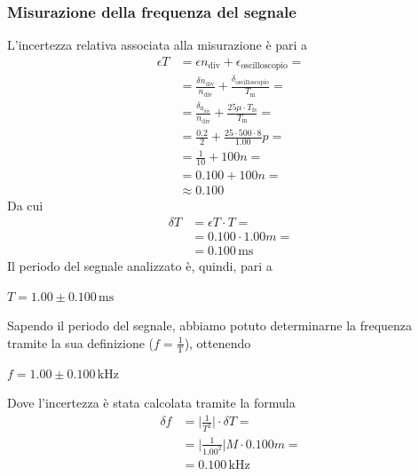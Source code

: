 \documentclass{article}
\begin{document}
			\subsubsection{Misurazione della frequenza del segnale}
				L'incertezza relativa associata alla misurazione è pari a 
				\begin{equation*}
					\begin{split}
						\epsilon T &= \epsilon n_{\mathrm{div}} + \epsilon_{\mathrm{oscilloscopio}} = \\
								   &= \frac{\delta n_{\mathrm{div}}}{n_{\mathrm{div}}} + \frac{\delta_{\mathrm{oscilloscopio}}}{T_{\mathrm{m}}} = \\
								   &= \frac{\delta_{\mathrm{n_{\mathrm{div}}}}}{n_{\mathrm{div}}} + \frac{25\mu \cdot T_{\mathrm{fs}}}{T_{\mathrm{m}}} = \\
								   &= \frac{0.2}{2} + \frac{25 \cdot 500 \cdot 8}{1.00}p = \\
								   &= \frac{1}{10} + 100n = \\
								   &= 0.100 + 100n = \\
								   &\approx 0.100
					\end{split}
				\end{equation*}
				Da cui
				\begin{equation*}
					\begin{split}
						\delta T &= \epsilon T \cdot T = \\
								 &= 0.100 \cdot 1.00m = \\
								 &= 0.100 \, \mathrm{ms}
					\end{split}
				\end{equation*}
				Il periodo del segnale analizzato è, quindi, pari a
				\newline
				\begin{center}
					$ T = 1.00 \pm 0.100 \, \mathrm{ms} $
				\end{center}
				\newline
				Sapendo il periodo del segnale, abbiamo potuto determinarne la frequenza tramite la sua definizione ($ f = \mathrm{\frac{1}{T}} $), ottenendo
				\newline
				\begin{center}
					$ f = 1.00 \pm 0.100 \, \mathrm{kHz} $
				\end{center}
				\newline
				Dove l'incertezza è stata calcolata tramite la formula
				\begin{equation*}
					\begin{split}
						\delta f &= \lvert \frac{1}{T^{2}} \rvert \cdot \delta T = \\
								 &= \lvert \frac{1}{1.00^{2}} \rvert M \cdot 0.100m = \\
								 &= 0.100 \, \mathrm{kHz}
					\end{split}
				\end{equation*}
\end{document}
